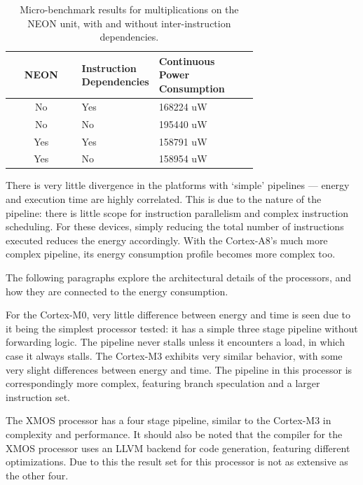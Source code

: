 \documentclass[twocolumn]{article}
\let\oldcaption\caption
\renewcommand{\caption}[1]{\oldcaption{\textup{#1}}}
\begin{document}
\begin{table}
	\centering
	\begin{tabular}{c p{0.3\linewidth} p{0.4\linewidth}}
		\bfseries NEON & \bfseries Instruction Dependencies & \bfseries Continuous Power Consumption \\
		\hline
		No & \centering Yes & {\hspace{0.85cm} 168224 uW } \\
		No & \centering No & {\hspace{0.85cm} 195440 uW } \\
		Yes & \centering Yes & {\hspace{0.85cm} 158791 uW } \\
		Yes & \centering No & {\hspace{0.85cm} 158954 uW } \\
	\end{tabular}
	\caption{Micro-benchmark results for multiplications on the NEON unit, with and without inter-instruction dependencies.}
	\label{Table:SIMD}
\end{table}

There is very little divergence in the platforms with `simple' pipelines --- energy and execution time are highly correlated. This is due to the nature of the pipeline: there is little scope for instruction parallelism and complex instruction scheduling. For these devices, simply reducing the total number of instructions executed reduces the energy accordingly. With the Cortex-A8's much more complex pipeline, its energy consumption profile becomes more complex too.

The following paragraphs explore the architectural details of the processors, and how they are connected to the energy consumption.

For the Cortex-M0, very little difference between energy and time is seen due to it being the simplest processor tested: it has a simple three stage pipeline without forwarding logic. The pipeline never stalls unless it encounters a load, in which case it always stalls. The Cortex-M3 exhibits very similar behavior, with some very slight differences between energy and time. The pipeline in this processor is correspondingly more complex, featuring branch speculation and a larger instruction set\cite{Yiu2010}.

The XMOS processor has a four stage pipeline, similar to the Cortex-M3 in complexity and performance. It should also be noted that the compiler for the XMOS processor uses an LLVM backend for code generation, featuring different optimizations. Due to this the result set for this processor is not as extensive as the other four.
\end{document}
